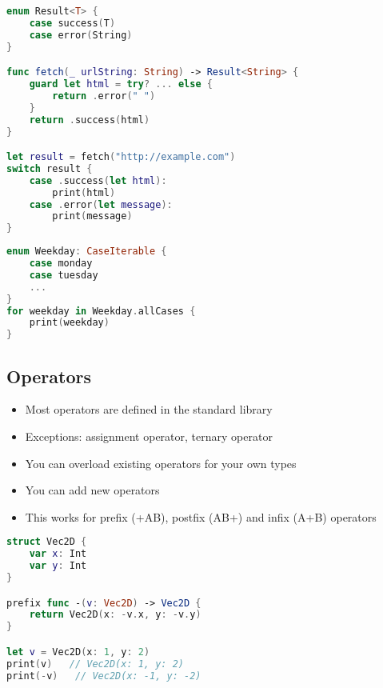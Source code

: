 \begin{breakbox}

\begin{lstlisting}[language=swift]
enum Result<T> {
    case success(T)
    case error(String)
}

func fetch(_ urlString: String) -> Result<String> {
    guard let html = try? ... else {
        return .error(" ")
    }
    return .success(html)
}

let result = fetch("http://example.com")
switch result {
    case .success(let html):
        print(html)
    case .error(let message):
        print(message)
}
\end{lstlisting}
\end{breakbox}

\begin{breakbox}


\begin{lstlisting}[language=swift]
enum Weekday: CaseIterable {
    case monday
    case tuesday
    ...
}
for weekday in Weekday.allCases {
    print(weekday)
}
\end{lstlisting}
\end{breakbox}

\subsection{Operators}

\begin{breakbox}

\begin{itemize}
\tightlist
\item
  Most operators are defined in the standard library
\item
  Exceptions: assignment operator, ternary operator
\item
  You can overload existing operators for your own types
\item
  You can add new operators
\item
  This works for prefix (+AB), postfix (AB+) and infix (A+B) operators
\end{itemize}

\begin{lstlisting}[language=swift]
struct Vec2D {
    var x: Int
    var y: Int
}

prefix func -(v: Vec2D) -> Vec2D {
    return Vec2D(x: -v.x, y: -v.y)
}

let v = Vec2D(x: 1, y: 2)
print(v)   // Vec2D(x: 1, y: 2)
print(-v)   // Vec2D(x: -1, y: -2)
\end{lstlisting}
\end{breakbox}


